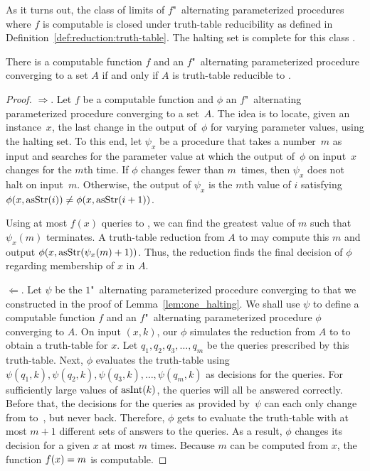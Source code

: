 As it turns out, the class of limits of $f$"~alternating parameterized procedures where $f$ is computable is closed under truth-table reducibility as defined in Definition~\ref{def:reduction:truth-table}.
The halting set is complete for this class \parencite{epstein1981hierarchies,arslanov1997degree,downey2010algorithmic}.
\begin{theorem}
\label{thm:truthtable_halt}%
  There is a computable function $f$ and an $f$"~alternating parameterized procedure converging to a set $A$ if and only if $A$ is truth-table reducible to .
\end{theorem}
\begin{proof}
  $\Longrightarrow$.
  Let $f$ be a computable function and $\phi$ an $f$"~alternating parameterized procedure converging to a set~$A$.
  The idea is to locate, given an instance~$x$, the last change in the output of~$\phi$ for varying parameter values, using the halting set.
  To this end, let $\psi_x$ be a procedure that takes a number~$m$ as input and searches for the parameter value at which the output of~$\phi$ on input~$x$ changes for the $m$th time.
  If $\phi$ changes fewer than $m$~times, then $\psi_x$ does not halt on input~$m$.
  Otherwise, the output of $\psi_x$ is the $m$th value of $i$ satisfying $\phi(x, \operatorname{asStr}(i)) \neq \phi(x, \operatorname{asStr}(i + 1))$.

  Using at most $f(x)$ queries to , we can find the greatest value of $m$ such that $\psi_x(m)$ terminates.
  A truth-table reduction from $A$ to  may compute this $m$ and output $\phi(x, \operatorname{asStr}(\psi_x(m) + 1))$.
  Thus, the reduction finds the final decision of $\phi$ regarding membership of $x$ in $A$.

  $\Longleftarrow$.
  Let $\psi$ be the $1$"~alternating parameterized procedure converging to  that we constructed in the proof of Lemma~\ref{lem:one_halting}.
  We shall use $\psi$ to define a computable function $f$ and an $f$"~alternating parameterized procedure $\phi$ converging to $A$.
  On input $(x, k)$, our $\phi$ simulates the reduction from $A$ to  to obtain a truth-table for $x$.
  Let $q_1, q_2, q_3, \ldots, q_m$ be the queries prescribed by this truth-table.
  Next, $\phi$ evaluates the truth-table using $\psi(q_1, k), \psi(q_2, k), \psi(q_3, k), \ldots, \psi(q_m, k)$ as decisions for the queries.
  For sufficiently large values of $\operatorname{asInt}(k)$, the queries will all be answered correctly.
  Before that, the decisions for the queries as provided by~$\psi$ can each only change from  to~, but never back.
  Therefore, $\phi$ gets to evaluate the truth-table with at most $m + 1$ different sets of answers to the queries.
  As a result, $\phi$ changes its decision for a given $x$ at most $m$ times.
  Because $m$ can be computed from $x$, the function $f(x) = m$ is computable.
\end{proof}

